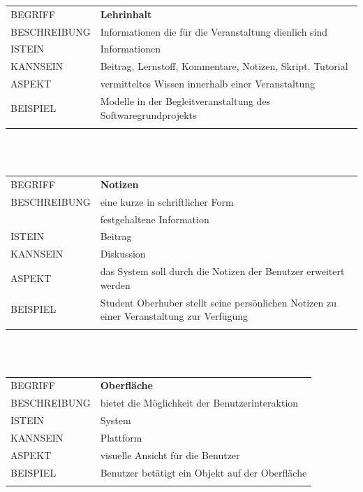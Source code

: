 \documentclass[12pt,a4paper]{article}
\begin{document}
\begin{tabular}{l p{12cm}}
	BEGRIFF 	 & \textbf{Lehrinhalt} \\ 
	BESCHREIBUNG & Informationen die für die Veranstaltung dienlich sind\\ 
	ISTEIN   	 & Informationen\\
	KANNSEIN 	 & Beitrag, Lernstoff, Kommentare, Notizen, Skript, Tutorial\\ 
	ASPEKT   	 & vermitteltes Wissen innerhalb einer Veranstaltung\\
	BEISPIEL 	 & Modelle in der Begleitveranstaltung des Softwaregrundprojekts\\\\
	\hline
\end{tabular}\\\\  

\begin{tabular}{l p{12cm}}
	BEGRIFF 	 & \textbf{Notizen} \\ 
	BESCHREIBUNG & eine kurze in schriftlicher Form\\
	& festgehaltene Information\\ 
	ISTEIN   	 & Beitrag\\
	KANNSEIN 	 & Diskussion\\ 
	ASPEKT   	 & das System soll durch die Notizen der Benutzer erweitert werden\\
	BEISPIEL 	 & Student Oberhuber stellt seine persönlichen Notizen zu einer Veranstaltung zur Verfügung\\\\
	\hline
\end{tabular}\\\\  

\begin{tabular}{l p{12cm}}
	BEGRIFF 	 & \textbf{Oberfläche} \\ 
	BESCHREIBUNG & bietet die Möglichkeit der Benutzerinteraktion\\ 
	ISTEIN   	 & System\\
	KANNSEIN 	 & Plattform\\ 
	ASPEKT   	 & visuelle Ansicht für die Benutzer\\
	BEISPIEL 	 & Benutzer betätigt ein Objekt auf der Oberfläche\\\\
	\hline
\end{tabular}\\\\  
\end{document}
